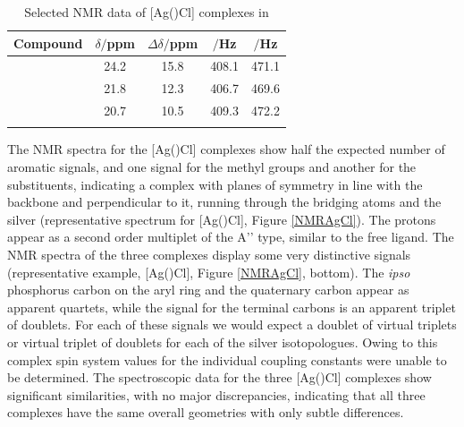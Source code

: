 \begin{table}[htbp]
\caption[Selected NMR data of [Ag(\tBuxantphos)Cl{]} complexes]{Selected NMR data of [Ag(\tBuxantphos)Cl] complexes in }
\label{table:silverchlorides}
\small
\begin{center}
\begin{tabular}{l c c c c}
	\toprule{}
	\bfseries{Compound}&\bfseries{$\delta$\phosphorus{}$/$ppm}&\bfseries{$\Delta\delta/$ppm}&\bfseries{\JAgPseven{}$/$Hz}&\bfseries{\JAgPnine{}$/$Hz}\\
	\midrule{}
	~\tBuSixantphos	&	24.2	&	15.8	&	408.1	&	471.1\\
	~\tBuThixantphos	& 	21.8	&	12.3	&	406.7	&	469.6\\
	~\tBuXantphos		&	20.7	&	10.5	&	409.3	&	472.2\\
	\bottomrule{}
\end{tabular}
\end{center}
\end{table}

The \proton{} NMR spectra for the [Ag(\tBuxantphos)Cl] complexes show half the expected number of aromatic signals, and one signal for the methyl groups and another for the \tBu{} substituents, indicating a complex with planes of symmetry in line with the backbone and perpendicular to it, running through the bridging atoms and the silver (representative spectrum for [Ag(\tBusixantphos)Cl], Figure \ref{NMRAgCl}).  The \tBu{} protons appear as a second order multiplet of the A'' type, similar to the free ligand.  The \carbon{} NMR spectra of the three complexes display some very distinctive signals (representative example, [Ag(\tBusixantphos)Cl], Figure \ref{NMRAgCl}, bottom).  The \emph{ipso} phosphorus carbon on the aryl ring and the quaternary \tBu{} carbon appear as apparent quartets, while the signal for the terminal \tBu{} carbons is an apparent triplet of doublets.  For each of these signals we would expect a doublet of virtual triplets or virtual triplet of doublets for each of the silver isotopologues.  Owing to this complex spin system values for the individual coupling constants were unable to be determined.  The spectroscopic data for the three [Ag(\tBuxantphos)Cl] complexes show significant similarities, with no major discrepancies, indicating that all three complexes have the same overall geometries with only subtle differences.  


